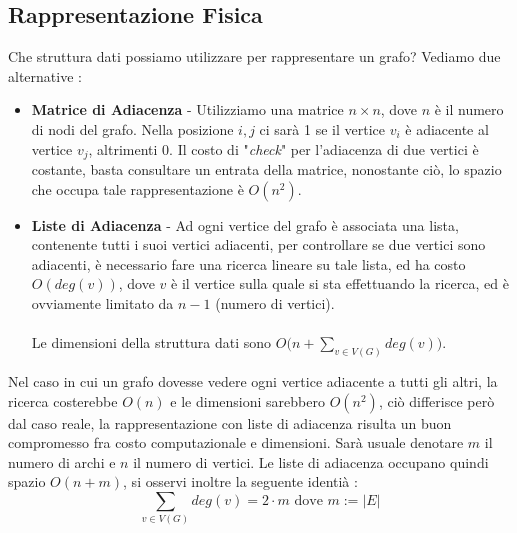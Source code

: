 \documentclass[12pt, letterpaper]{article}
\newcommand{\acc}{\\\hphantom{}\\}
\begin{document}
\subsection{Rappresentazione Fisica}
Che struttura dati possiamo utilizzare per rappresentare un grafo? Vediamo due alternative : \begin{itemize}
    \item \textbf{Matrice di Adiacenza} - Utilizziamo una matrice $n\times n$, dove \(n\) è il numero di 
    nodi del grafo. Nella posizione \(i,j\) ci sarà 1 se il vertice \(v_i\) è adiacente al vertice 
    \(v_j\), altrimenti 0. Il costo di "\textit{check}" per l'adiacenza di due vertici è costante, basta 
    consultare un entrata della matrice, nonostante ciò, lo spazio che occupa tale rappresentazione è 
    \(O(n^2)\).
    \item \textbf{Liste di Adiacenza} - Ad ogni vertice del grafo è associata una lista, contenente tutti 
    i suoi vertici adiacenti, per controllare se due vertici sono adiacenti, è necessario fare una ricerca 
    lineare su tale lista, ed ha costo $\displaystyle O(deg(v))$, dove \(v\) è il vertice sulla 
    quale si sta effettuando la ricerca, ed è ovviamente limitato da \(n-1\) (numero di vertici).\acc
    Le dimensioni della struttura dati sono $\displaystyle O\big(n + \sum_{v\in V(G)}deg(v)\big)$.
\end{itemize}
Nel caso in cui un grafo dovesse vedere ogni vertice adiacente a tutti gli altri, la ricerca costerebbe 
\(O(n)\) e le dimensioni sarebbero \(O(n^2)\), ciò differisce però dal caso reale, la rappresentazione con 
liste di adiacenza risulta un buon compromesso fra costo computazionale e dimensioni.
Sarà usuale denotare \(m\) il numero di archi e \(n\) il numero di vertici.
Le liste di adiacenza occupano quindi spazio $O(n+m)$,  si osservi inoltre la 
seguente identià : $$\sum_{v\in V(G)}deg(v)=2\cdot m\text{ dove }m:=|E|$$
\end{document}
